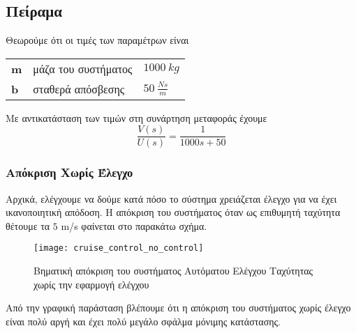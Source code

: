 \subsection{Πείραμα}
\noindent
Θεωρούμε ότι οι τιμές των παραμέτρων είναι
\begin{flushleft}
\begin{tabular}{lll}
\textbf{m} & μάζα του συστήματος & $1000\ kg$ \\
\textbf{b} & σταθερά απόσβεσης & $50\ \frac{Ns}{m}$
\end{tabular}
\end{flushleft}
Με αντικατάσταση των τιμών στη συνάρτηση μεταφοράς έχουμε
\begin{equation}
\frac{V(s)}{U(s)} = \frac{1}{1000s+50}
\end{equation}

\subsubsection{Απόκριση Χωρίς Έλεγχο}

Αρχικά, ελέγχουμε να δούμε κατά πόσο το σύστημα χρειάζεται έλεγχο για να έχει ικανοποιητική απόδοση. Η απόκριση του συστήματος όταν ως επιθυμητή ταχύτητα θέτουμε τα $5$ m/s φαίνεται στο παρακάτω σχήμα.

\begin{figure}[h]
  \centering
  \texttt{[image: cruise\_control\_no\_control]}
  \caption{Βηματική απόκριση του συστήματος Αυτόματου Ελέγχου Ταχύτητας χωρίς την εφαρμογή ελέγχου}
  \label{fig:cruise_control_no_control}
\end{figure}

Από την γραφική παράσταση βλέπουμε ότι η απόκριση του συστήματος χωρίς έλεγχο είναι πολύ αργή και έχει πολύ μεγάλο σφάλμα μόνιμης κατάστασης. 

%
%

